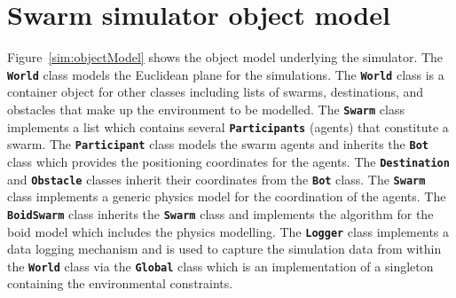 \section{Swarm simulator object model}\label{sim:Simulator3}
Figure~\ref{sim:objectModel} shows the object model underlying the simulator. The \texttt{\textbf{World}} class models the Euclidean plane for the simulations. The \texttt{\textbf{World}} class is a container object for other classes including lists of swarms, destinations, and obstacles that make up the environment to be modelled. The \texttt{\textbf{Swarm}} class implements a list which contains several \texttt{\textbf{Participants}} (agents) that constitute a swarm. The \texttt{\textbf{Participant}} class models the swarm agents and inherits the \texttt{\textbf{Bot}} class which provides the positioning coordinates for the agents. The \texttt{\textbf{Destination}} and \texttt{\textbf{Obstacle}} classes inherit their coordinates from the \texttt{\textbf{Bot}} class. The \texttt{\textbf{Swarm}} class implements a generic physics model for the coordination of the agents. The \texttt{\textbf{BoidSwarm}} class inherits the \texttt{\textbf{Swarm}} class and implements the algorithm for the boid model which includes the physics modelling. The \texttt{\textbf{Logger}} class implements a data logging mechanism and is used to capture the simulation data from within the \texttt{\textbf{World}} class via the \texttt{\textbf{Global}} class which is an implementation of a singleton containing the environmental constraints.

